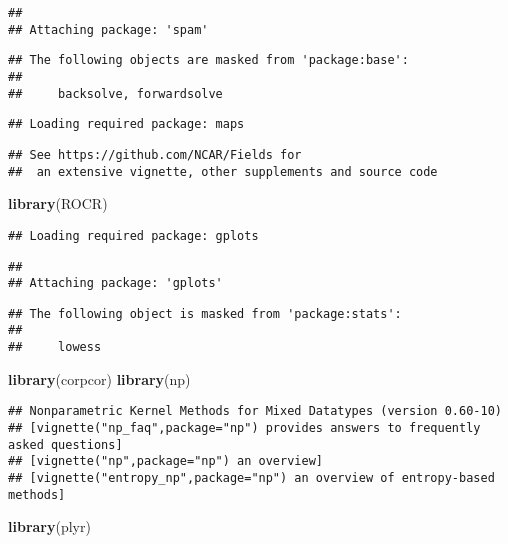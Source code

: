 \documentclass[
]{article}
\newenvironment{Shaded}{\begin{snugshade}}{\end{snugshade}}
\newcommand{\KeywordTok}[1]{\textcolor[rgb]{0.13,0.29,0.53}{\textbf{#1}}}
\newcommand{\NormalTok}[1]{#1}
\begin{document}
\begin{verbatim}
## 
## Attaching package: 'spam'
\end{verbatim}

\begin{verbatim}
## The following objects are masked from 'package:base':
## 
##     backsolve, forwardsolve
\end{verbatim}

\begin{verbatim}
## Loading required package: maps
\end{verbatim}

\begin{verbatim}
## See https://github.com/NCAR/Fields for
##  an extensive vignette, other supplements and source code
\end{verbatim}

\begin{Shaded}
\begin{Highlighting}[]
\KeywordTok{library}\NormalTok{(ROCR)}
\end{Highlighting}
\end{Shaded}

\begin{verbatim}
## Loading required package: gplots
\end{verbatim}

\begin{verbatim}
## 
## Attaching package: 'gplots'
\end{verbatim}

\begin{verbatim}
## The following object is masked from 'package:stats':
## 
##     lowess
\end{verbatim}

\begin{Shaded}
\begin{Highlighting}[]
\KeywordTok{library}\NormalTok{(corpcor)}
\KeywordTok{library}\NormalTok{(np)}
\end{Highlighting}
\end{Shaded}

\begin{verbatim}
## Nonparametric Kernel Methods for Mixed Datatypes (version 0.60-10)
## [vignette("np_faq",package="np") provides answers to frequently asked questions]
## [vignette("np",package="np") an overview]
## [vignette("entropy_np",package="np") an overview of entropy-based methods]
\end{verbatim}

\begin{Shaded}
\begin{Highlighting}[]
\KeywordTok{library}\NormalTok{(plyr)}
\end{Highlighting}
\end{Shaded}
\end{document}
